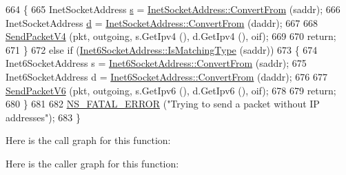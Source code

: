 \begin{DoxyCode}
664     \{
665       InetSocketAddress \hyperlink{generate__test__data__lte__sinr_8m_ad83eeb3a142285d1243a08c6b7026df8}{s} = \hyperlink{classns3_1_1InetSocketAddress_ade776b1109e7b9a7be0b22ced49931e3}{InetSocketAddress::ConvertFrom} (saddr);
666       InetSocketAddress \hyperlink{buildings__pathloss_8m_a9f9b934daed17a4d3613b6886ff4cf4b}{d} = \hyperlink{classns3_1_1InetSocketAddress_ade776b1109e7b9a7be0b22ced49931e3}{InetSocketAddress::ConvertFrom} (daddr);
667 
668       \hyperlink{classns3_1_1TcpL4Protocol_ae57806dce4847383a27e329656e77e14}{SendPacketV4} (pkt, outgoing, s.GetIpv4 (), d.GetIpv4 (), oif);
669 
670       \textcolor{keywordflow}{return};
671     \}
672   \textcolor{keywordflow}{else} \textcolor{keywordflow}{if} (\hyperlink{classns3_1_1Inet6SocketAddress_a4d928c54affbfb530a12076d6d7e0540}{Inet6SocketAddress::IsMatchingType} (saddr))
673     \{
674       Inet6SocketAddress s = \hyperlink{classns3_1_1Inet6SocketAddress_a2177c66e1bcf17c85dcffb9d2a971f5a}{Inet6SocketAddress::ConvertFrom} (saddr);
675       Inet6SocketAddress d = \hyperlink{classns3_1_1Inet6SocketAddress_a2177c66e1bcf17c85dcffb9d2a971f5a}{Inet6SocketAddress::ConvertFrom} (daddr);
676 
677       \hyperlink{classns3_1_1TcpL4Protocol_a12831eb88c02c37b3cf42cdda814cd19}{SendPacketV6} (pkt, outgoing, s.GetIpv6 (), d.GetIpv6 (), oif);
678 
679       \textcolor{keywordflow}{return};
680     \}
681 
682   \hyperlink{group__fatal_ga5131d5e3f75d7d4cbfd706ac456fdc85}{NS\_FATAL\_ERROR} (\textcolor{stringliteral}{"Trying to send a packet without IP addresses"});
683 \}
\end{DoxyCode}


Here is the call graph for this function\+:




Here is the caller graph for this function\+:


